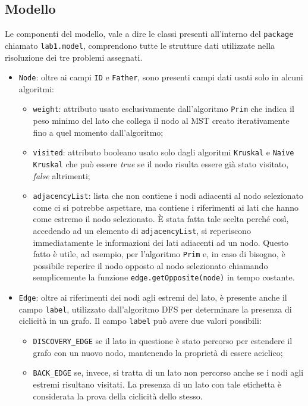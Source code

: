 \subsection{Modello}
Le componenti del modello, vale a dire le classi presenti all'interno del \texttt{package} chiamato \texttt{lab1.model}, comprendono tutte le strutture dati utilizzate nella risoluzione dei tre problemi assegnati. 
\begin{itemize}
\item \texttt{Node}: oltre ai campi \texttt{ID} e \texttt{Father}, sono presenti campi dati usati solo in alcuni algoritmi:
	\begin{itemize}
		\item \texttt{weight}: attributo usato esclusivamente dall'algoritmo \texttt{Prim} che indica il peso minimo del lato che collega il nodo al MST creato iterativamente fino a quel momento dall'algoritmo;
		\item \texttt{visited}: attributo booleano usato solo dagli algoritmi \texttt{Kruskal} e \texttt{Naive Kruskal} che può essere \emph{true} se il nodo risulta essere già stato visitato, \emph{false} altrimenti;
		\item \texttt{adjacencyList}: lista che non contiene i nodi adiacenti al nodo selezionato come ci si potrebbe aspettare, ma contiene i riferimenti ai lati che hanno come estremo il nodo selezionato. È stata fatta tale scelta perché così, accedendo ad un elemento di \texttt{adjacencyList}, si reperiscono immediatamente le informazioni dei lati adiacenti ad un nodo. Questo fatto è utile, ad esempio, per l'algoritmo \texttt{Prim} e, in caso di bisogno, è possibile reperire il nodo opposto al nodo selezionato chiamando semplicemente la funzione \texttt{edge.getOpposite(node)} in tempo costante.
	\end{itemize}
	\item \texttt{Edge}: oltre ai riferimenti dei nodi agli estremi del lato, è presente anche il campo \texttt{label}, utilizzato dall'algoritmo DFS per determinare la presenza di ciclicità in un grafo. Il campo \texttt{label} può avere due valori possibili:
	\begin{itemize}
		\item \texttt{DISCOVERY\_EDGE} se il lato in questione è stato percorso per estendere il grafo con un nuovo nodo, mantenendo la proprietà di essere aciclico;
		\item \texttt{BACK\_EDGE} se, invece, si tratta di un lato non percorso anche se i nodi agli estremi risultano visitati. La presenza di un lato con tale etichetta è considerata la prova della ciclicità dello stesso.

\end{itemize}
\end{itemize}
